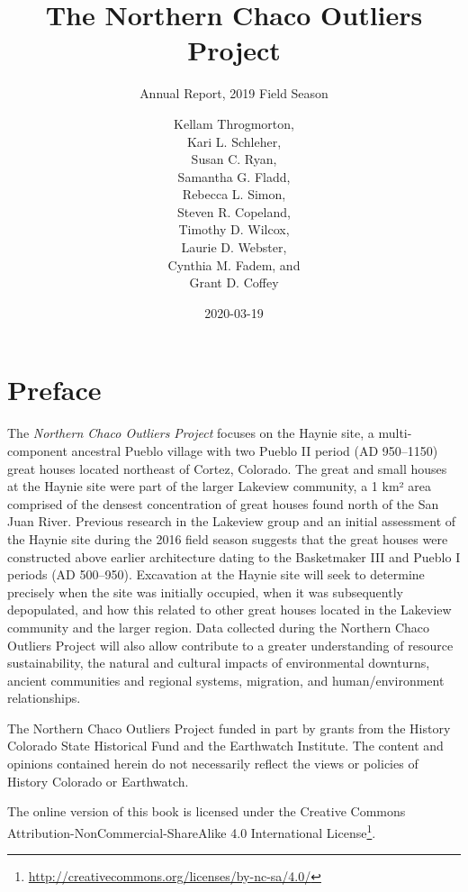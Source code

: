 \documentclass[
  12pt,
]{krantz}
\title{The Northern Chaco Outliers Project}
\subtitle{Annual Report, 2019 Field Season}
\author{Kellam Throgmorton,\\
Kari L. Schleher,\\
Susan C. Ryan,\\
Samantha G. Fladd,\\
Rebecca L. Simon,\\
Steven R. Copeland,\\
Timothy D. Wilcox,\\
Laurie D. Webster,\\
Cynthia M. Fadem, and\\
Grant D. Coffey}
\date{2020-03-19}
\renewcommand{\href}[2]{#2\footnote{\url{#1}}}
\begin{document}
\maketitle

\thispagestyle{empty}

\setlength{\abovedisplayskip}{-5pt}
\setlength{\abovedisplayshortskip}{-5pt}

{
\hypersetup{linkcolor=}
\setcounter{tocdepth}{2}
\tableofcontents
}
\listoftables
\listoffigures
\hypertarget{preface}{%
\chapter{Preface}\label{preface}}

The \emph{Northern Chaco Outliers Project} focuses on the Haynie site, a multi-component ancestral Pueblo village with two Pueblo II period (AD 950--1150) great houses located northeast of Cortez, Colorado. The great and small houses at the Haynie site were part of the larger Lakeview community, a 1 km² area comprised of the densest concentration of great houses found north of the San Juan River. Previous research in the Lakeview group and an initial assessment of the Haynie site during the 2016 field season suggests that the great houses were constructed above earlier architecture dating to the Basketmaker III and Pueblo I periods (AD 500--950). Excavation at the Haynie site will seek to determine precisely when the site was initially occupied, when it was subsequently depopulated, and how this related to other great houses located in the Lakeview community and the larger region. Data collected during the Northern Chaco Outliers Project will also allow contribute to a greater understanding of resource sustainability, the natural and cultural impacts of environmental downturns, ancient communities and regional systems, migration, and human/environment relationships.

The Northern Chaco Outliers Project funded in part by grants from the History Colorado State Historical Fund and the Earthwatch Institute. The content and opinions contained herein do not necessarily reflect the views or policies of History Colorado or Earthwatch.

The online version of this book is licensed under the \href{http://creativecommons.org/licenses/by-nc-sa/4.0/}{Creative Commons Attribution-NonCommercial-ShareAlike 4.0 International License}.
\end{document}
